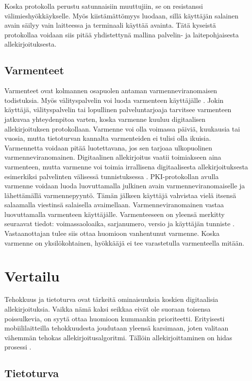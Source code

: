 \documentclass[finnish]{tktltiki2}
\theoremstyle{definition}
\theoremstyle{remark}
\begin{document}
Koska protokolla perustu satunnaisiin muuttujiin, se on resistanssi välimieshyökkäykselle. Myös kiistämättömyys luodaan, sillä käyttäjän salainen avain säilyy vain laitteessa ja terminaali käyttää avainta. Tätä kyseistä protokollaa voidaan siis pitää yhdistettynä mallina palvelin- ja laitepohjaisesta allekirjoituksesta.


\subsection{Varmenteet}

Varmenteet ovat kolmannen osapuolen antaman varmenneviranomaisen todistuksia. Myös välityspalvelin voi luoda varmenteen käyttäjälle \cite{proxy}. Jokin käyttäjä, välityspalvelin tai lopullinen palveluntarjoaja tarvitsee varmenteen jatkuvaa yhteydenpitoa varten, koska varmenne kuuluu digitaalisen allekirjoituksen protokollaan. Varmenne voi olla voimassa päiviä, kuukausia tai vuosia, mutta tietoturvan kannalta varmenteiden ei tulisi olla ikuisia. Varmennetta voidaan pitää luotettavana, jos sen tarjoaa ulkopuolinen varmenneviranomainen. Digitaalinen allekirjoitus vaatii toimiakseen aina varmenteen, mutta varmenne voi toimia irrallisena digitaalisesta allekirjoituksesta esimerkiksi palvelinten välisessä tunnistuksessa \cite{proxy}. PKI-protokollan avulla varmenne voidaan luoda luovuttamalla julkinen avain varmenneviranomaiselle ja lähettämällä varmennepyyntö. Tämän jälkeen käyttäjä vahvistaa vielä itsensä salaamalla viestinsä salaisella avaimellaan. Varmenneviranomainen vastaa luovuttamalla varmenteen käyttäjälle. Varmenteeseen on yleensä merkitty seuraavat tiedot: voimassaoloaika, sarjanumero, versio ja käyttäjän tunniste \cite{ECC}. Vastaanottajan tulee siis ottaa huomioon vanhentunut varmenne. Koska varmenne on yksilökohtainen, hyökkääjä ei tee varastetulla varmenteella mitään. 

\section{Vertailu}

Tehokkuus ja tietoturva ovat tärkeitä ominaisuuksia koskien digitaalisia allekirjoituksia. Vaikka nämä kaksi seikkaa eivät ole suoraan toisensa poissulkevia, on syytä ottaa huomioon kummankin prioriteetti. Erityisesti mobiililaitteilla tehokkuudesta joudutaan yleensä karsimaan, joten valitaan vähemmän tehokas allekirjoitusalgoritmi. Tällöin allekirjoittaminen on hidas prosessi \cite{proxy}.

\subsection{Tietoturva}
\end{document}
